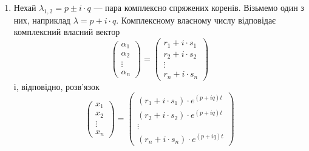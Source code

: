 \begin{enumerate}
\item Нехай $\lambda_{1,2} = p \pm i \cdot q$ --- пара комплексно спряжених коренів. Візьмемо один з них, наприклад $\lambda = p + i \cdot q$. Комплексному власному числу відповідає комплексний власний вектор
\begin{equation*}
	\begin{pmatrix} \alpha_1 \\ \alpha_2 \\ \vdots \\ \alpha_n \end{pmatrix} =
	\begin{pmatrix} r_1 + i \cdot s_1 \\ r_2 + i \cdot s_2 \\ \vdots \\ r_n + i \cdot s_n \end{pmatrix}
\end{equation*}
і, відповідно, розв’язок
\begin{equation*}
	\begin{pmatrix} x_1 \\ x_2 \\ \vdots \\ x_n \end{pmatrix} =
	\begin{pmatrix} (r_1 + i \cdot s_1) \cdot e^{(p + i q) t} \\ (r_2 + i \cdot s_2) \cdot e^{(p + i q) t} \\ \vdots \\ (r_n + i \cdot s_n) \cdot e^{(p + i q) t} \end{pmatrix}
\end{equation*}


\end{enumerate}
